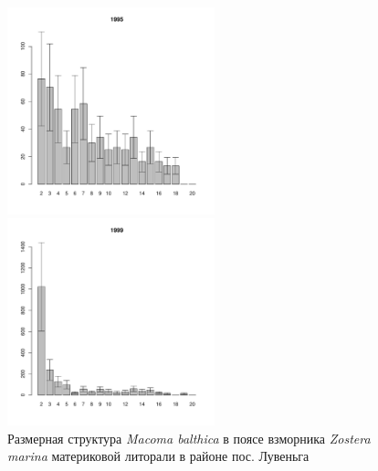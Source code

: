 \begin{figure}[hp]
	\begin{minipage}[b]{.3\linewidth}
	\begin{center}
	\includegraphics[width=60mm]{../White_Sea/Luvenga_II_razrez/zostera_zone2_1995_.pdf}
	\end{center}
	\end{minipage}
	\hfill
	\begin{minipage}[b]{.3\linewidth}
	\begin{center}
	\includegraphics[width=60mm]{../White_Sea/Luvenga_II_razrez/zostera_zone2_1999_.pdf}
	\end{center}
	\end{minipage}
	\hfill
	\begin{minipage}[b]{.3\linewidth}
	\begin{center}

	\end{center}
	\end{minipage}
\caption{Размерная структура {\it Macoma balthica} в поясе взморника {\it Zostera marina} материковой литорали в районе пос. Лувеньга}
\label{ris:size_str_2razrez_zostera}
\end{figure}

